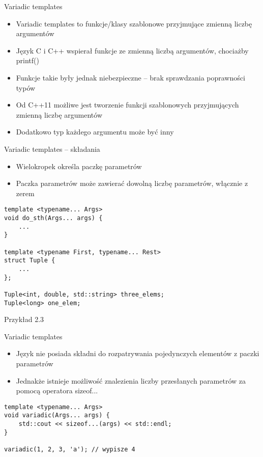 \documentclass[11pt]{beamer}
\begin{document}
\begin{frame}[fragile]{Variadic templates}
    \begin{itemize}
        \item Variadic templates to funkcje/klasy szablonowe przyjmujące zmienną liczbę argumentów
        \item Język C i C++ wspierał funkcje ze zmienną liczbą argumentów, chociażby printf()
        \item Funkcje takie były jednak niebezpieczne -- brak sprawdzania poprawności typów
        \item Od C++11 możliwe jest tworzenie funkcji szablonowych przyjmujących zmienną liczbę argumentów
        \item Dodatkowo typ każdego argumentu może być inny
    \end{itemize}
\end{frame}

\begin{frame}[fragile]{Variadic templates -- składania}
    \begin{itemize}
        \item Wielokropek określa paczkę parametrów
        \item Paczka parametrów może zawierać dowolną liczbę parametrów, włącznie z zerem
    \end{itemize}
    \begin{lstlisting}[frame=single]
template <typename... Args>
void do_sth(Args... args) {
    ...
}

template <typename First, typename... Rest>
struct Tuple {
    ...
};

Tuple<int, double, std::string> three_elems;
Tuple<long> one_elem;
    \end{lstlisting}
    \alert{Przykład 2.3}
\end{frame}

\begin{frame}[fragile]{Variadic templates}
    \begin{itemize}
        \item Język nie posiada składni do rozpatrywania pojedynczych elementów z paczki parametrów
        \item Jednakże istnieje możliwość znalezienia liczby przesłanych parametrów za pomocą operatora sizeof...
    \end{itemize}
    \begin{lstlisting}[frame=single]
template <typename... Args>
void variadic(Args... args) {
    std::cout << sizeof...(args) << std::endl;
}

variadic(1, 2, 3, 'a'); // wypisze 4
    \end{lstlisting}
\end{frame}
\end{document}
